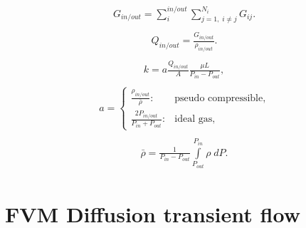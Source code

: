 \documentclass[a4paper,12pt]{extreport}
\begin{document}
\begin{eqnarray}
\begin{gathered}
G_{in/out} = \sum_{i}^{in/out} \sum^{N_{i}}_{j=1, \; i\neq j} G_{ij}.
\end{gathered}
\end{eqnarray}
\begin{eqnarray}
\begin{gathered}
Q_{in/out} = \frac{G_{in/out}}{\rho_{in/out}}.
\end{gathered}
\end{eqnarray}
\begin{eqnarray}
\begin{gathered}
k = a \frac{Q_{in/out}}{A} \frac{\mu L}{P_{in} - P_{out}},
\end{gathered}
\end{eqnarray}
\begin{eqnarray}
\begin{gathered}
a =\begin{cases}
\frac{\rho_{in/out}}{\bar{\rho}}: &\text{pseudo compressible},\\
\frac{2P_{in/out}}{P_{in} + P_{out}}: &\text{ideal gas},
\end{cases}
\end{gathered}
\end{eqnarray}
\begin{eqnarray}
\begin{gathered}
\bar{\rho}=\frac{1}{P_{in}-P_{out}} \int\limits^{P_{in}}_{P_{out}}\rho \; dP.
\end{gathered}
\end{eqnarray}

    \section*{FVM Diffusion transient flow}
\end{document}
